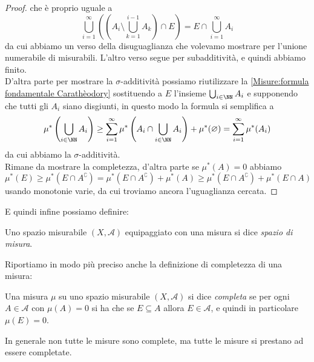 \documentclass[11pt]{scrartcl}
\newcommand{\eset}{\varnothing}
\begin{document}
\begin{proof}
		che è proprio uguale a
		$$\bigcup_{i=1}^\infty\left(\left(A_i\setminus \bigcup_{k=1}^{i-1}A_k\right)\cap E\right)=E \cap \bigcup_{i=1}^\infty A_i $$
		da cui abbiamo un verso della disuguaglianza che volevamo mostrare per l'unione numerabile di misurabili. L'altro verso segue per subadditività, e quindi abbiamo finito. \\
		D'altra parte per mostrare la $\sigma$-additività possiamo riutilizzare la \ref{Misure:formula fondamentale Carathèodory} sostituendo a $E$ l'insieme $\bigcup_{i\in \NN} A_i$ e supponendo che tutti gli $A_i$ siano disgiunti, in questo modo la formula si semplifica a 
		$$\mu^*\left(\bigcup_{i\in\NN}A_i\right)\ge \sum_{i=1}^{\infty}\mu^*\left(A_i\cap \bigcup_{i\in \NN}A_i\right)+\mu^*(\eset)=\sum_{i=1}^{\infty}\mu^*(A_i)$$
		da cui abbiamo la $\sigma$-additività.
		\\
		Rimane da mostrare la completezza, d'altra parte se $\mu^*(A)=0$ abbiamo
		$$\mu^*(E)\ge \mu^*(E\cap A^\complement)=\mu^*(E\cap A^\complement)+\mu^*(A)\ge \mu^*(E\cap A^\complement)+\mu^*(E\cap A)$$
		usando monotonie varie, da cui troviamo ancora l'uguaglianza cercata.
	\end{proof}
	E quindi infine possiamo definire:
	\begin{definition}
		Uno spazio misurabile $(X,\mathcal{A})$ equipaggiato con una misura si dice \textit{spazio di misura}.
	\end{definition}
	Riportiamo in modo più preciso anche la definizione di completezza di una misura:
	\begin{definition}[Completezza]
		Una misura $\mu$ su uno spazio misurabile $(X,\mathcal{A})$ si dice \textit{completa} se per ogni $A\in \mathcal{A}$ con $\mu(A)=0$ si ha che se $E\subseteq A$ allora $E\in \mathcal{A}$, e quindi in particolare $\mu(E)=0$. 
	\end{definition}
	In generale non tutte le misure sono complete, ma tutte le misure si prestano ad essere completate.
	
\end{document}
